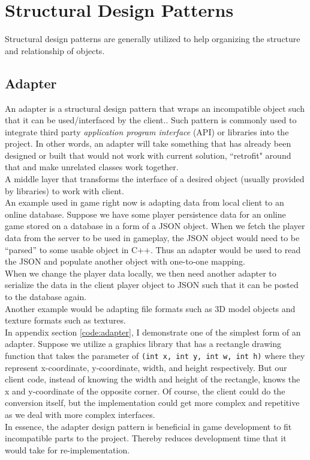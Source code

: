 \section{Structural Design Patterns}

\iftwocolumns
\begin{multicols}{2}
\fi

Structural design patterns are generally utilized to help organizing the structure and relationship of objects.

\subsection{Adapter}

An adapter is a structural design pattern that wraps an incompatible object such that it can be used/interfaced by the client.\cite{sm-adapter}. Such pattern is commonly used to integrate third party \textit{application program interface} (API) or libraries into the project. In other words, an adapter will take something that has already been designed or built that would not work with current solution, ``retrofit" around that and make unrelated classes work together.\cite{sm-adapter}\bs
\\
A middle layer that transforms the interface of a desired object (usually provided by libraries) to work with client.\bs
\\
An example used in game right now is adapting data from local client to an online database. Suppose we have some  player persistence data for an online game stored on a database in a form of a JSON object. When we fetch the player data from the server to be used in gameplay, the JSON object would need to be ``parsed'' to some usable object in C++. Thus an adapter would be used to read the JSON and populate another object with one-to-one mapping.\bs
\\
When we change the player data locally, we then need another adapter to serialize the data in the client player object to JSON such that it can be posted to the database again.\bs
\\
Another example would be adapting file formats such as 3D model objects and texture formats such as textures.\bs
\\
In appendix section \ref{code:adapter}, I demonstrate one of the simplest form of an adapter. Suppose we utilize a graphics library that has a rectangle drawing function that takes the parameter of \texttt{(int x, int y, int w, int h)} where they represent x-coordinate, y-coordinate, width, and height respectively. But our client code, instead of knowing the width and height of the rectangle, knows the x and y-coordinate of the opposite corner. Of course, the client could do the conversion itself, but the implementation could get more complex and repetitive as we deal with more complex interfaces.\bs
\\
In essence, the adapter design pattern is beneficial in game development to fit incompatible parts to the project. Thereby reduces development time that it would take for re-implementation.\bs
\\


\end{multicols}
